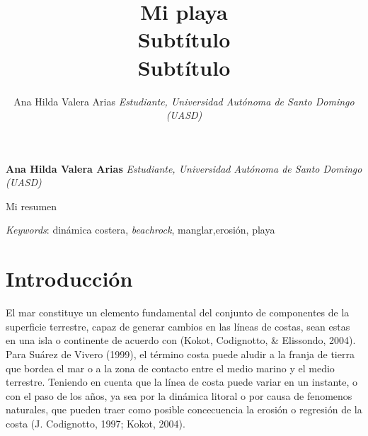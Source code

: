 \documentclass[11pt,]{article}
\title{Mi playa\\
Subtítulo\\
Subtítulo  }
\author{\Large Ana Hilda Valera Arias\vspace{0.05in} \newline\normalsize\emph{Estudiante, Universidad Autónoma de Santo Domingo (UASD)}  }
\date{}
\newcommand*{\authorfont}{\fontfamily{phv}\selectfont}
\renewenvironment{abstract}
 {{%
    \setlength{\leftmargin}{0mm}
    \setlength{\rightmargin}{\leftmargin}%
  }%
  \relax}
 {\endlist}
\begin{document}
	
%

{%
\setlength{\parindent}{0pt}
\thispagestyle{plain}
{\fontsize{18}{20}\selectfont\raggedright 
\maketitle  %

}

{
   \vskip 13.5pt\relax \normalsize\fontsize{11}{12} 
\textbf{\authorfont Ana Hilda Valera Arias} \hskip 15pt \emph{\small Estudiante, Universidad Autónoma de Santo Domingo (UASD)}   

}

}








\begin{abstract}

    \hbox{\vrule height .2pt width 39.14pc}

    \vskip 8.5pt %

\noindent Mi resumen


\vskip 8.5pt \noindent \emph{Keywords}: dinámica costera, \emph{beachrock}, manglar,erosión, playa \par

    \hbox{\vrule height .2pt width 39.14pc}



\end{abstract}


\vskip 6.5pt


\noindent  \section{Introducción}\label{introducciuxf3n}

El mar constituye un elemento fundamental del conjunto de componentes de
la superficie terrestre, capaz de generar cambios en las líneas de
costas, sean estas en una isla o continente de acuerdo con (Kokot,
Codignotto, \& Elissondo, 2004). Para Suárez de Vivero (1999), el
término costa puede aludir a la franja de tierra que bordea el mar o a
la zona de contacto entre el medio marino y el medio terrestre. Teniendo
en cuenta que la línea de costa puede variar en un instante, o con el
paso de los años, ya sea por la dinámica litoral o por causa de
fenomenos naturales, que pueden traer como posible concecuencia la
erosión o regresión de la costa (J. Codignotto, 1997; Kokot, 2004).
\end{document}
